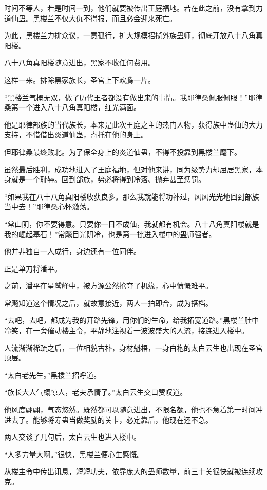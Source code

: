 \begin{this_body}
时间不等人，若是时间一到，他们就要被传出王庭福地。若在此之前，没有拿到力道仙蛊。黑楼兰不仅大仇不得报，而且必会迎来死亡。

为此，黑楼兰力排众议，一意孤行，扩大规模招揽外族蛊师，彻底开放八十八角真阳楼。

八十八角真阳楼随意进出，黑家不收任何费用。

这样一来。排除黑家族长，圣宫上下欢腾一片。

“黑楼兰气概无双，做了历代王者都没有做出来的事情。我耶律桑佩服佩服！”耶律桑第一个进入八十八角真阳楼，红光满面。

他是耶律部族的当代族长，本来是此次王庭之主的热门人物，获得族中蛊仙的大力支持，不惜借出炎道仙蛊，寄托在他的身上。

但耶律桑最终败北。为了保全身上的炎道仙蛊，不得不投靠到黑楼兰麾下。

虽然最后胜利，成功地进入了王庭福地，但对他来讲，同为级势力却屈居黑家，本身就是一个耻辱。回到部族，势必将得到冷落、抛弃甚至惩罚。

“如果我在八十八角真阳楼收获良多。那么我就能将功补过，风风光光地回到部族当中去！”耶律桑心怀激荡。

“常山阴，你不要得意。只要你一日不成仙，我就都有机会。八十八角真阳楼就是我的崛起基石！”常飚目光阴冷，也是第一批进入楼中的蛊师强者。

他并非独自一人成行，身边还有一位同伴。

正是单刀将潘平。

之前，潘平在星鹫峰中，被方源公然抢夺了机缘，心中愤慨难平。

常飚知道这个情况之后，就故意接近，两人一拍即合，成为搭档。

“去吧，去吧，都成为我的开路先锋，用你们的生命，给我拓宽道路。”黑楼兰肚中冷笑，在一旁催动楼主令，平静地注视着一波波盛大的人流，接连进入楼中。

人流渐渐稀疏之后，一位相貌古朴，身材魁梧，一身白袍的太白云生也出现在圣宫顶层。

“太白老先生。”黑楼兰招呼道。

“族长大人气概惊人，老夫承情了。”太白云生交口赞叹道。

他风度翩翩，气态悠然。既然都可以随意进出，不限名额，他也不急着第一时间冲进去了。能够将寿蛊当做奖励的关卡，必定靠后，他现在还不急。

两人交谈了几句后，太白云生也进入楼中。

“人多力量大啊。”很快，黑楼兰便心生感慨。

从楼主令中传出讯息，短短功夫，依靠庞大的蛊师数量，前三十关很快就被连续攻克。


\end{this_body}
